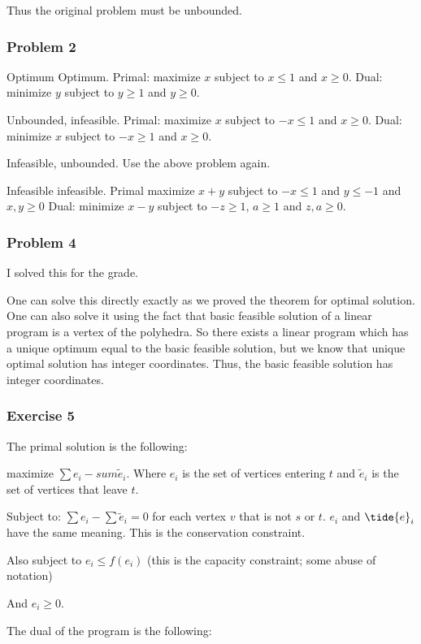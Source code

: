 \documentclass[11pt]{article}
\begin{document}
Thus the original problem must be unbounded.
\subsubsection{Problem 2}
\label{sec:org5d82d4e}
Optimum Optimum. Primal: maximize \(x\) subject to \(x \le 1\) and \(x \ge 0\).
Dual: minimize \(y\) subject to \(y \ge 1\) and \(y \ge 0\).

Unbounded, infeasible. Primal: maximize \(x\) subject to \(-x \le 1\) and \(x \ge
    0\). Dual: minimize \(x\) subject to \(-x \ge 1\) and \(x \ge 0\).

Infeasible, unbounded. Use the above problem again.

Infeasible infeasible. Primal maximize \(x + y\) subject to \(-x \le 1\) and \(y
    \le -1\) and \(x, y \ge 0\) Dual: minimize \(x - y\) subject to \(-z \ge 1\), \(a
    \ge 1\) and \(z, a \ge 0\).
\subsubsection{Problem 4}
\label{sec:org119ade9}
I solved this for the grade.

One can solve this directly exactly as we proved the theorem for optimal
solution. One can also solve it using the fact that basic feasible solution
of a linear program is a vertex of the polyhedra. So there exists a linear
program which has a unique optimum equal to the basic feasible solution, but
we know that unique optimal solution has integer coordinates. Thus, the
basic feasible solution has integer coordinates.
\subsubsection{Exercise 5}
\label{sec:org7bb9b01}
The primal solution is the following:

maximize \(\sum e_i - sum \tilde{e}_i\). Where \(e_i\) is the set of vertices
entering \(t\) and \(\tilde{e}_i\) is the set of vertices that leave \(t\).

Subject to: \(\sum e_i - \sum \tilde{e}_i = 0\) for each vertex \(v\) that is
not \(s\) or \(t\). \(e_i\) and \(\tide{e}_i\) have the same meaning. This is the
conservation constraint.

Also subject to \(e_i \le f(e_i)\) (this is the capacity constraint; some
abuse of notation)

And \(e_i \ge 0\).

The dual of the program is the following:
\end{document}
